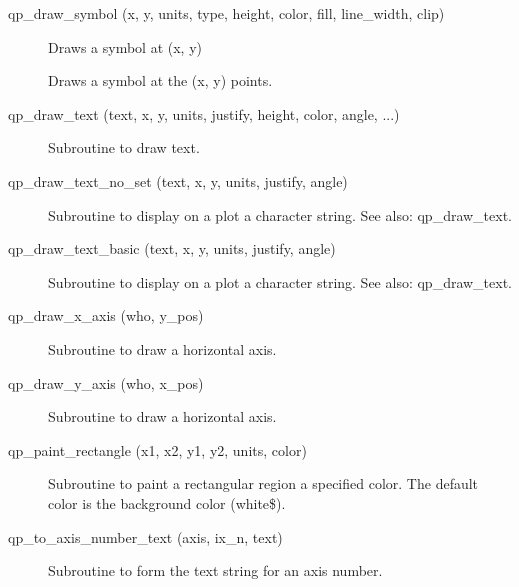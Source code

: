\begin{description}
\label{r:qp.draw.symbol}
\item[qp_draw_symbol (x, y, units, type, height, color, fill, line_width, clip)] \Newline 
     Draws a symbol at (x, y) 

\label{r:qp.draw.symbols}
\item[\protect\parbox{6in}{qp_draw_symbols (x, y, units, type, height, color, \\
  \hspace*{2in} fill, line_width, clip, symbol_every)} ] \Newline 
     Draws a symbol at the (x, y) points. 

\label{r:qp.draw.text}
\item[qp_draw_text (text, x, y, units, justify, height, color, angle, ...) ] \Newline 
     Subroutine to draw text.

\label{r:qp.draw.text.no.set}
\item[qp_draw_text_no_set (text, x, y, units, justify, angle)] \Newline 
Subroutine to display on a plot a character string.
See also: qp_draw_text.

\label{r:qp.draw.text.basic}
\item[qp_draw_text_basic (text, x, y, units, justify, angle)] \Newline 
     Subroutine to display on a plot a character string.
     See also: qp_draw_text.

\label{r:qp.draw.x.axis}
\item[qp_draw_x_axis (who, y_pos)] \Newline 
     Subroutine to draw a horizontal axis.

\label{r:qp.draw.y.axis}
\item[qp_draw_y_axis (who, x_pos)] \Newline 
     Subroutine to draw a horizontal axis.

\label{r:qp.paint.rectangle}
\item[qp_paint_rectangle (x1, x2, y1, y2, units, color)] \Newline 
Subroutine to paint a rectangular region a specified color.
The default color is the background color (white\$).

\label{r:qp.to.axis.number.text}
\item[qp_to_axis_number_text (axis, ix_n, text)] \Newline 
     Subroutine to form the text string for an axis number.

\end{description}

